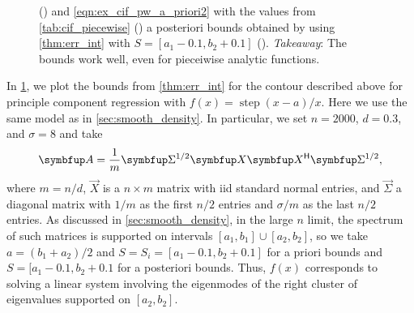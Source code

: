 \begin{figure}[ht]
{    ({\protect{}}) and \cref{eqn:ex_cif_pw_a_priori2} with the values from \cref{tab:cif_piecewise}
    ({\protect{}}) 
    a posteriori bounds obtained by using \cref{thm:err_int} with \( S = [a_1-0.1,b_2+0.1] \)
    ({\protect{}}). 
    \hspace{.25em}\emph{Takeaway}: The bounds work well, even for pieceiwise analytic functions.
    }
    \label{fig:ch7_pcr}
\end{figure}


In \cref{fig:ch7_pcr}, we plot the bounds from \cref{thm:err_int} for the contour described above for principle component regression with \( f(x) = \operatorname{step}(x-a)/x \).
Here we use the same model as in \cref{sec:smooth_density}. 
In particular, we set \( n=2000 \), \( d=0.3 \), and \( \sigma = 8 \) and take
\begin{equation*}
    \vec{A} = \frac{1}{m} \vec{\Sigma}^{1/2} \vec{X} \vec{X}^\cT \vec{\Sigma}^{1/2},
\end{equation*}
where \( m = n/d \), \( \vec{X} \) is a \( n\times m \) matrix with iid standard normal entries, and \( \vec{\Sigma} \) a diagonal matrix with \( 1/m \) as the first \( n/2 \) entries and \( \sigma/m \) as the last \( n/2 \) entries.
As discussed in \cref{sec:smooth_density}, in the large \( n \) limit, the spectrum of such matrices is supported on intervals \( [a_1,b_1]\cup[a_2,b_2] \), so we take \( a = (b_1+a_2)/2 \) and \( S = S_i = [a_1-0.1,b_2+0.1]\) for a priori bounds and \( S = [a_1-0.1,b_2+0.1 \) for a posteriori bounds.
Thus, \( f(x) \) corresponds to solving a linear system involving the eigenmodes of the right cluster of eigenvalues supported on \( [a_2,b_2] \).





